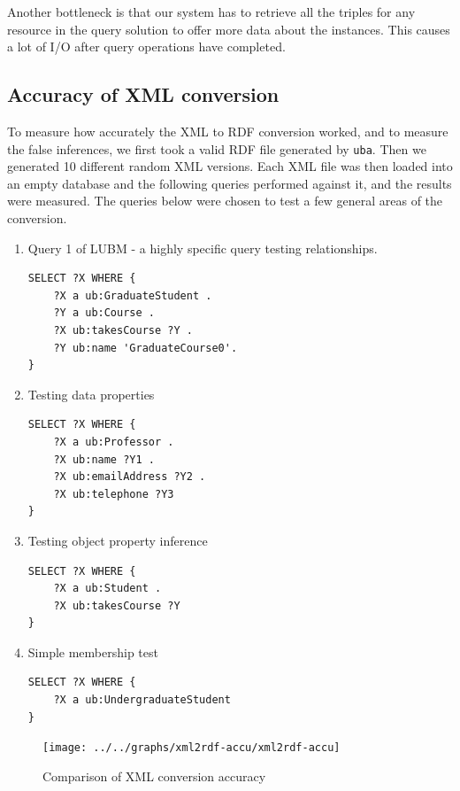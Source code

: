 \documentclass[journal]{IEEEtran}
\begin{document}
Another bottleneck is that our system has to retrieve all the triples for any
resource in the query solution to offer more data about the instances. This
causes a lot of I/O after query operations have completed.

\subsection{Accuracy of XML conversion}

To measure how accurately the XML to RDF conversion worked, and to measure the
false inferences, we first took a valid RDF file generated by \texttt{uba}.
Then we generated 10 different random XML versions. Each XML file was then
loaded into an empty database and the following queries performed against it,
and the results were measured. The queries below were chosen to test a few
general areas of the conversion.

\begin{enumerate}
    \item Query 1 of LUBM - a highly specific query testing relationships.
        \begin{verbatim}
SELECT ?X WHERE {
    ?X a ub:GraduateStudent .
    ?Y a ub:Course .
    ?X ub:takesCourse ?Y .
    ?Y ub:name 'GraduateCourse0'.
}
        \end{verbatim}

    \item Testing data properties
        \begin{verbatim}
SELECT ?X WHERE {
    ?X a ub:Professor .
    ?X ub:name ?Y1 .
    ?X ub:emailAddress ?Y2 .
    ?X ub:telephone ?Y3
}
        \end{verbatim}

    \item Testing object property inference
        \begin{verbatim}
SELECT ?X WHERE {
    ?X a ub:Student .
    ?X ub:takesCourse ?Y
}
        \end{verbatim}

    \item Simple membership test
        \begin{verbatim}
SELECT ?X WHERE {
    ?X a ub:UndergraduateStudent
}
        \end{verbatim}
\end{enumerate}

\begin{figure}[h]
    \centering
    \texttt{[image: ../../graphs/xml2rdf-accu/xml2rdf-accu]}
    \caption{Comparison of XML conversion accuracy}
    \label{fig:eval:accu}
\end{figure}
\end{document}
